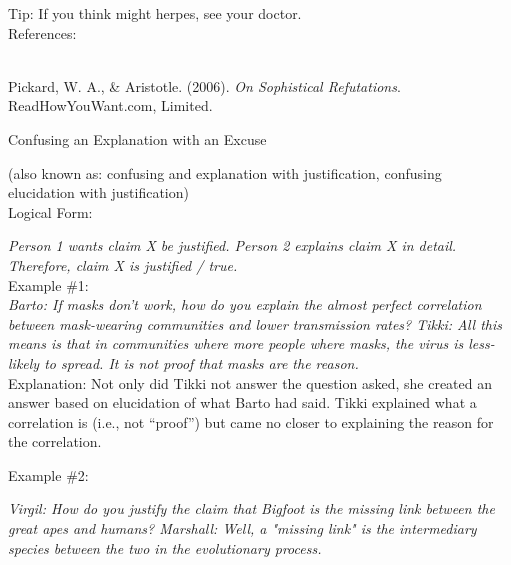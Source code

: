 \documentclass[a4paper,12pt,single,pdftex]{scrbook}
\begin{document}
    
      Tip: If you think might herpes, see your doctor.
    \\

    References:

    
      
        
      \\

      
        
          Pickard, W. A., \& Aristotle. (2006). {\it On Sophistical Refutations}. ReadHowYouWant.com, Limited.
        
      
    
  

Confusing an Explanation with an Excuse
    
      (also known as: confusing and explanation with justification, confusing elucidation with justification)
    \\

  
    Logical Form:

    
      {\em Person 1 wants claim X be justified. \newline
Person 2 explains claim X in detail. \newline
Therefore, claim X is justified / true.}
    \\

    
      Example \#1:
    \\

    
      {\em Barto: If masks don’t work, how do you explain the almost perfect correlation between mask-wearing communities and lower transmission rates? \newline
Tikki: All this means is that in communities where more people where masks, the virus is less-likely to spread. It is not proof that masks are the reason.}
    \\

    
      Explanation: Not only did Tikki not answer the question asked, she created an answer based on elucidation of what Barto had said. Tikki explained what a correlation is (i.e., not “proof”) but came no closer to explaining the reason for the correlation.
    
    
      
    
    
      Example \#2: \newline
 \newline

    
    
      {\em Virgil: How do you justify the claim that Bigfoot is the missing link between the great apes and humans? \newline
Marshall: Well, a "missing link" is the intermediary species between the two in the evolutionary process. \newline
 \newline
}
    
\end{document}
